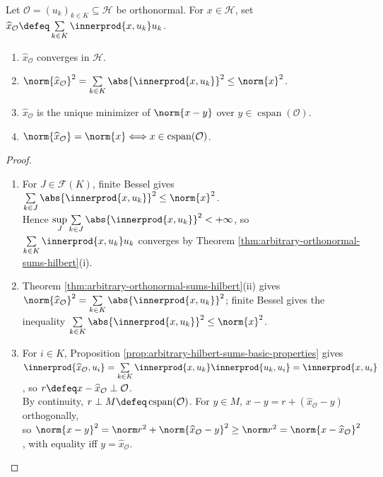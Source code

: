 \begin{theorem} \label{thm:hilbert-fourier-expansion-general} \\
Let $\mathcal{O}=(u_k)_{k\in K}\subseteq\mathcal{H}$ be orthonormal. For $x\in\mathcal{H}$, set $\widehat{x}_{\mathcal{O}}\defeq\sum\limits_{k\in K}\innerprod{x,u_k}u_k$.
\begin{enumerate}[label=(\roman*)]
\setlength{\itemsep}{0pt}
\item $\widehat{x}_{\mathcal{O}}$ converges in $\mathcal{H}$.
\item $\norm{\widehat{x}_{\mathcal{O}}}^2=\sum\limits_{k\in K}\abs{\innerprod{x,u_k}}^2\leq\norm{x}^2$.
\item $\widehat{x}_{\mathcal{O}}$ is the unique minimizer of $\norm{x-y}$ over $y\in\operatorname{cspan}(\mathcal{O})$.
\item $\norm{\widehat{x}_{\mathcal{O}}}=\norm{x}\Longleftrightarrow x\in\operatorname{cspan}(\mathcal{O})$.
\end{enumerate}
\begin{proof}
\begin{enumerate}[label=(\roman*)]
\setlength{\itemsep}{0pt}
\item[$(i)$] For $J\in\mathcal F(K)$, finite Bessel gives $\sum\limits_{k\in J}\abs{\innerprod{x,u_k}}^2\leq\norm{x}^2$.\\
Hence $\sup\limits_J\sum\limits_{k\in J}\abs{\innerprod{x,u_k}}^2<+\infty$, so $\sum\limits_{k\in K}\innerprod{x,u_k}u_k$ converges by Theorem \ref{thm:arbitrary-orthonormal-sums-hilbert}(i).
\item[$(ii)$] Theorem \ref{thm:arbitrary-orthonormal-sums-hilbert}(ii) gives $\norm{\widehat{x}_{\mathcal O}}^2=\sum\limits_{k\in K}\abs{\innerprod{x,u_k}}^2$; finite Bessel gives the inequality $\sum\limits_{k\in K}\abs{\innerprod{x,u_k}}^2\leq\norm{x}^2$.
\item[$(iii)$] For $i\in K$, Proposition \ref{prop:arbitrary-hilbert-sums-basic-properties} gives $\innerprod{\widehat{x}_{\mathcal O},u_i}=\sum\limits_{k\in K}\innerprod{x,u_k}\innerprod{u_k,u_i}=\innerprod{x,u_i}$, so $r\defeq x-\widehat{x}_{\mathcal O}\perp\mathcal O$.\\
By continuity, $r\perp M\defeq\operatorname{cspan}(\mathcal O)$. For $y\in M$, $x-y=r+(\widehat{x}_{\mathcal O}-y)$ orthogonally,\\
so $\norm{x-y}^2=\norm r^2+\norm{\widehat{x}_{\mathcal O}-y}^2\geq\norm r^2=\norm{x-\widehat{x}_{\mathcal O}}^2$, with equality iff $y=\widehat{x}_{\mathcal O}$.

\end{enumerate}
\end{proof}
\end{theorem}
